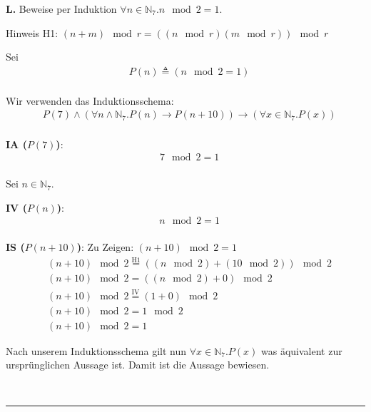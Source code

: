 \documentclass[10pt,leqno ]{article}
\newcommand\customeq[1]{\overset{\mathrm{#1}}{=}}
\theoremstyle{definition}
\newenvironment{solution}[1][L]{\begin{doublespace}\textbf{#1.}\quad }{\ \rule{0.5em}{0.5em}\end{doublespace}}
\begin{document}
\begin{solution}
    Beweise per Induktion \( \forall n \in \mathbb N_7 . n \mod 2 = 1\).

    Hinweis H1: \( (n+m) \mod r = ((n \mod r)(m \mod r)) \mod r \)

    Sei  
    \begin{equation*}
        \begin{aligned}
        &  P(n) \triangleq (n\mod 2 = 1 ) \\
        \end{aligned}
    \end{equation*}

    Wir verwenden das Induktionsschema: 
    \begin{equation*}
        \begin{aligned}
        &  P(7) \land (\forall n \land \mathbb N_7 . P(n) \rightarrow P(n+10)) \rightarrow (\forall x \in \mathbb N_7 . P(x)) \\
        \end{aligned}
    \end{equation*}

    \textbf{IA (}\(P(7)\)\textbf{)}:
    \begin{equation*}
        \begin{aligned}
        & 7\mod 2 = 1 \\
        \end{aligned}
    \end{equation*}

    Sei \( n \in \mathbb N_7 \).

    \textbf{IV (}\(P(n)\)\textbf{)}:
    \begin{equation*}
        \begin{aligned}
        &  n \mod 2 = 1 \\
        \end{aligned}
    \end{equation*}

    \textbf{IS (}\(P(n+10)\)\textbf{)}: Zu Zeigen: \( (n + 10) \mod 2=1 \)
    \begin{equation*}
        \begin{aligned}
        & (n + 10) \mod 2 \customeq{H1} ((n \mod 2)+(10 \mod 2)) \mod 2 \\
        & (n + 10) \mod 2 = ((n \mod 2) + 0) \mod 2 \\
        & (n + 10) \mod 2 \customeq{IV} (1 + 0) \mod 2 \\
        & (n + 10) \mod 2 = 1 \mod 2 \\
        & (n + 10) \mod 2 = 1
        \end{aligned}
    \end{equation*}

    Nach unserem Induktionsschema gilt nun \( \forall x \in \mathbb N_7 . P(x) \) was äquivalent zur ursprünglichen Aussage ist. Damit ist die Aussage bewiesen.


\end{solution}
\end{document}
